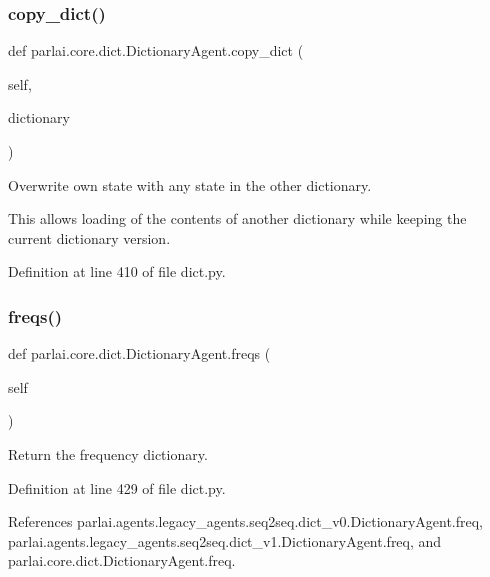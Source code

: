 \subsubsection{\texorpdfstring{copy\+\_\+dict()}{copy\_dict()}}
{\footnotesize\ttfamily def parlai.\+core.\+dict.\+Dictionary\+Agent.\+copy\+\_\+dict (\begin{DoxyParamCaption}\item[{}]{self,  }\item[{}]{dictionary }\end{DoxyParamCaption})}

\begin{DoxyVerb}Overwrite own state with any state in the other dictionary.

This allows loading of the contents of another dictionary while keeping
the current dictionary version.
\end{DoxyVerb}
 

Definition at line 410 of file dict.\+py.

\mbox{\label{classparlai_1_1core_1_1dict_1_1DictionaryAgent_a72cfec62b2d5117326f514edfe848a1e}} 
\subsubsection{\texorpdfstring{freqs()}{freqs()}}
{\footnotesize\ttfamily def parlai.\+core.\+dict.\+Dictionary\+Agent.\+freqs (\begin{DoxyParamCaption}\item[{}]{self }\end{DoxyParamCaption})}

\begin{DoxyVerb}Return the frequency dictionary.\end{DoxyVerb}
 

Definition at line 429 of file dict.\+py.



References parlai.\+agents.\+legacy\+\_\+agents.\+seq2seq.\+dict\+\_\+v0.\+Dictionary\+Agent.\+freq, parlai.\+agents.\+legacy\+\_\+agents.\+seq2seq.\+dict\+\_\+v1.\+Dictionary\+Agent.\+freq, and parlai.\+core.\+dict.\+Dictionary\+Agent.\+freq.

\mbox{\label{classparlai_1_1core_1_1dict_1_1DictionaryAgent_a57685af2fcd0a684b7102c55afe0c8ad}} 
